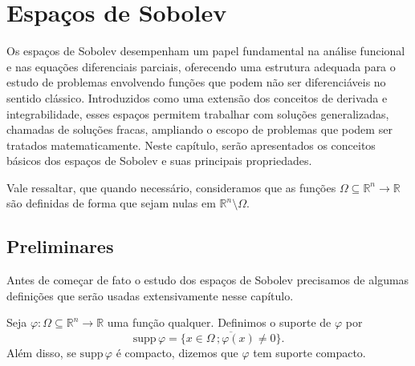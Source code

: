 \documentclass[a4paper, 11pt]{book}
\theoremstyle{definition}
\newcommand{\bN}{\mathbb{N}}
\newcommand{\bR}{\mathbb{R}}
\newcommand{\bK}{\mathbb{K}}
\newcommand{\cC}{\mathcal{C}}
\newcommand{\supp}{\mathrm{supp}\,}
\begin{document}




\chapter{Espaços de Sobolev} \label{ch:sobolev}

Os espaços de Sobolev desempenham um papel fundamental na análise funcional e nas equações diferenciais parciais, oferecendo uma estrutura adequada para o estudo de problemas envolvendo funções que podem não ser diferenciáveis no sentido clássico. Introduzidos como uma extensão dos conceitos de derivada e integrabilidade, esses espaços permitem trabalhar com soluções generalizadas, chamadas de soluções fracas, ampliando o escopo de problemas que podem ser tratados matematicamente. Neste capítulo, serão apresentados os conceitos básicos dos espaços de Sobolev e suas principais propriedades.

Vale ressaltar, que quando necessário, consideramos que as funções $\Omega \subseteq \bR^n \to \bR$ são definidas de forma que sejam nulas em $\bR^n \setminus \Omega$. 

\section{Preliminares}

Antes de começar de fato o estudo dos espaços de Sobolev precisamos de algumas definições que serão usadas extensivamente nesse capítulo.

\begin{dbox} \label{def:suporte}
    Seja $\varphi : \Omega \subseteq \bR ^n \to \bR$ uma função qualquer. Definimos o suporte de $\varphi$ por
    \[
        \supp \varphi = \overline{\{x \in \Omega \,; \varphi(x) \neq 0\}}.
    \]
    Além disso, se $\supp\varphi$ é compacto, dizemos que $\varphi$ tem suporte compacto.
\end{dbox}
\end{document}
